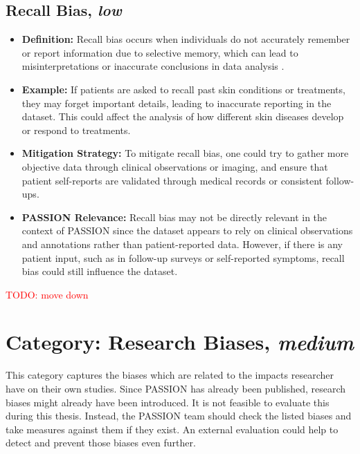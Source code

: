 \documentclass[12pt, a4paper, oneside]{book}   	%
\renewcommand{\todo}[1]{\textcolor{red}{TODO: #1}}
\begin{document}
\begin{appendices}
		\subsection{Recall Bias, \textit{low}}
		\begin{itemize}
			\item \textbf{Definition:} Recall bias occurs when individuals do not accurately remember or report information due to selective memory, which can lead to misinterpretations or inaccurate conclusions in data analysis \autocites{Mester_2022,Chakraborty_2024}.
			\item \textbf{Example:} If patients are asked to recall past skin conditions or treatments, they may forget important details, leading to inaccurate reporting in the dataset. This could affect the analysis of how different skin diseases develop or respond to treatments.
			\item \textbf{Mitigation Strategy:} To mitigate recall bias, one could try to gather more objective data through clinical observations or imaging, and ensure that patient self-reports are validated through medical records or consistent follow-ups.
			\item \textbf{PASSION Relevance:} Recall bias may not be directly relevant in the context of PASSION since the dataset appears to rely on clinical observations and annotations rather than patient-reported data. However, if there is any patient input, such as in follow-up surveys or self-reported symptoms, recall bias could still influence the dataset.
		\end{itemize}
		
		\todo{move down}
		\section{Category: Research Biases, \textit{medium}} \label{biasCategoryResearchBiasesMedium}
		This category captures the biases which are related to the impacts researcher have on their own studies. Since PASSION has already been published, research biases might already have been introduced. It is not feasible to evaluate this during this thesis. Instead, the PASSION team should check the listed biases and take measures against them if they exist. An external evaluation could help to detect and prevent those biases even further.
		

\end{appendices}
\end{document}
